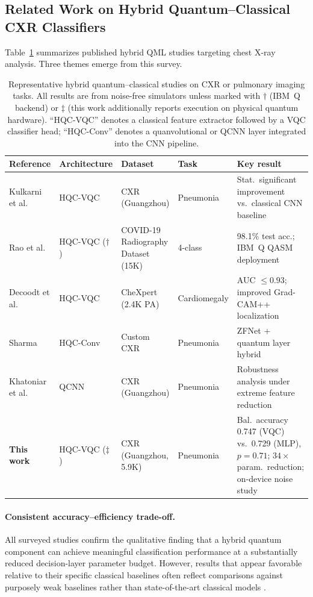 \documentclass[11pt,a4paper]{article}
\begin{document}
\subsection{Related Work on Hybrid Quantum--Classical CXR Classifiers}
\label{sec:relwork}

Table~\ref{tab:related} summarizes published hybrid QML studies targeting
chest X-ray analysis.  Three themes emerge from this survey.

\begin{table}[htbp]
\centering
\small
\caption{Representative hybrid quantum--classical studies on CXR or pulmonary
  imaging tasks.  All results are from noise-free simulators unless marked
  with $\dagger$ (IBM~Q backend) or $\ddagger$ (this work additionally reports
  execution on physical quantum hardware).  ``HQC-VQC'' denotes a classical
  feature extractor followed by a VQC classifier head; ``HQC-Conv'' denotes a
  quanvolutional or QCNN layer integrated into the CNN pipeline.}
\label{tab:related}
\begin{tabular}{@{}p{2.8cm}p{2.0cm}p{2.0cm}p{2.2cm}p{4.0cm}@{}}
\toprule
Reference & Architecture & Dataset & Task & Key result \\
\midrule
Kulkarni et al.~\cite{kulkarni2023} & HQC-VQC & CXR (Guangzhou) & Pneumonia & Stat.\ significant improvement vs.\ classical CNN baseline \\
Rao et al.~\cite{rao2024} & HQC-VQC ($\dagger$) & COVID-19 Radiography Dataset (15K) & 4-class & 98.1\% test acc.; IBM~Q QASM deployment \\
Decoodt et al.~\cite{decoodt2023} & HQC-VQC & CheXpert (2.4K PA) & Cardiomegaly & AUC $\leq 0.93$; improved Grad-CAM++ localization \\
Sharma~\cite{sharmaR2023hybrid} & HQC-Conv & Custom CXR & Pneumonia & ZFNet + quantum layer hybrid \\
Khatoniar et al.~\cite{khatoniar2024} & QCNN & CXR (Guangzhou) & Pneumonia & Robustness analysis under extreme feature reduction \\
\textbf{This work} & HQC-VQC ($\ddagger$) & CXR (Guangzhou, 5.9K) & Pneumonia & Bal.\ accuracy 0.747 (VQC) vs.\ 0.729 (MLP), $p=0.71$; $34\times$ param.\ reduction; on-device noise study \\
\bottomrule
\end{tabular}
\end{table}

\paragraph{Consistent accuracy--efficiency trade-off.}
All surveyed studies confirm the qualitative finding that a hybrid quantum
component can achieve meaningful classification performance at a substantially
reduced decision-layer parameter budget.  However, results that appear
favorable relative to their specific classical baselines often reflect
comparisons against purposely weak baselines rather than state-of-the-art
classical models \cite{aaronson2015}.
\end{document}
